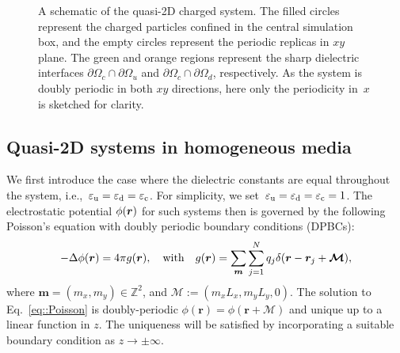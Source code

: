 \begin{figure}[htbp]
    \caption{
        A schematic of the quasi-2D charged system.
        The filled circles represent the charged particles confined in the central simulation box, and the empty circles represent the periodic replicas in $xy$ plane.
        The green and orange regions represent the sharp dielectric interfaces $\partial \Omega_c \cap \partial \Omega_{u}$ and $\partial \Omega_c \cap \partial \Omega_{d}$, respectively.
        As the system is doubly periodic in both $xy$ directions, here only the periodicity in~$x$ is sketched for clarity.
    }
    \label{fig:box}
\end{figure}

\subsection{Quasi-2D systems in homogeneous media}

We first introduce the case where the dielectric constants are equal throughout the system, i.e.,~$\varepsilon_{\mathrm{u}} = \varepsilon_{\mathrm{d}} = \varepsilon_{\mathrm{c}}$. For simplicity, we set~$\varepsilon_{\mathrm{u}} = \varepsilon_{\mathrm{d}} = \varepsilon_{\mathrm{c}} = 1$.
The electrostatic potential $\phi(\boldsymbol{r})$ for such systems then is governed by the following Poisson's equation with doubly periodic boundary conditions (DPBCs):
\begin{equation}\label{eq::Poisson}
	-\Delta\phi(\bm{r}) = 4\pi g(\bm{r}), \quad \text{with} \quad g(\bm{r})= \sum_{\V{m}}\sum_{j=1}^{N}q_{j}\delta(\bm{r}-\bm{r}_{j}+\bm{\mathcal{M}}),%
\end{equation}
where $\bm{m}=(m_x,m_y) \in\mathbb{Z}^2$, and $\bm{\mathcal{M}} := (m_x L_x, m_y L_y, 0)$.
The solution to Eq.~\eqref{eq::Poisson} is doubly-periodic $\phi(\bm{r})=\phi(\bm{r} + \bm{\mathcal{M}})$ and unique up to a linear function in $z$. The uniqueness will be satisfied by incorporating a suitable boundary condition as $z\to\pm\infty$.

